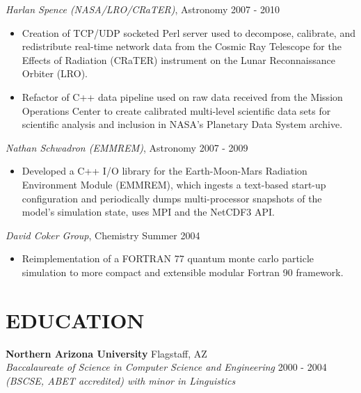 \documentclass[line,margin]{res}
\begin{document}
\begin{resume}
\newpage
          {\sl Harlan Spence (NASA/LRO/CRaTER)}, Astronomy \hfill 2007 - 2010
          \begin{itemize} \itemsep -2pt
          \item
            Creation of TCP/UDP socketed Perl server used to decompose, calibrate, and redistribute real-time network data from the Cosmic Ray Telescope for the Effects of Radiation (CRaTER) instrument on the Lunar Reconnaissance Orbiter (LRO).
          \item
            Refactor of C++ data pipeline used on raw data received from the Mission Operations Center to create calibrated multi-level scientific data sets for scientific analysis and inclusion in NASA's Planetary Data System archive.
          \end{itemize}

          {\sl Nathan Schwadron (EMMREM)}, Astronomy \hfill 2007 - 2009
          \begin{itemize} \itemsep -2pt
          \item
            Developed a C++ I/O library for the Earth-Moon-Mars Radiation Environment Module (EMMREM), which ingests a text-based start-up configuration and periodically dumps multi-processor snapshots of the model's simulation state, uses MPI and the NetCDF3 API.
          \end{itemize}

          {\sl David Coker Group}, Chemistry \hfill Summer 2004
          \begin{itemize} \itemsep -2pt
          \item
            Reimplementation of a FORTRAN 77 quantum monte carlo particle simulation to more compact and extensible modular Fortran 90 framework.
          \end{itemize}

  \section{EDUCATION}
          {\bf Northern Arizona University} \hfill Flagstaff, AZ\\
          {\sl Baccalaureate of Science in Computer Science and Engineering} \hfill 2000 - 2004\\
          {\sl (BSCSE, ABET accredited) with minor in Linguistics}


\end{resume}
\end{document}
